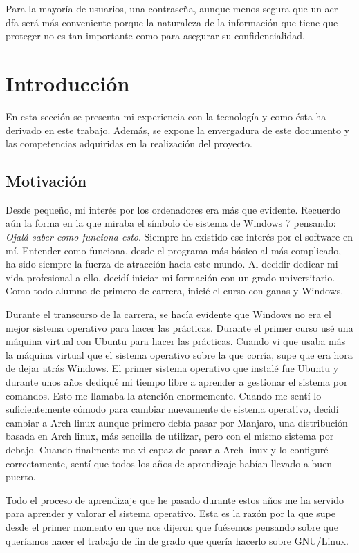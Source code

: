 \documentclass[titlepage, 12pt, a4paper]{article}
\begin{document}
Para la mayoría de usuarios, una contraseña, aunque menos segura que un \gls{acr-dfa} será más conveniente porque la naturaleza de la información que tiene que proteger no es tan importante como para asegurar su confidencialidad.
\clearpage
\section{Introducción}
En esta sección se presenta mi experiencia con la tecnología y como ésta ha derivado en este trabajo. Además, se expone la envergadura de este documento y las competencias adquiridas en la realización del proyecto.
\subsection{Motivación}
Desde pequeño, mi interés por los ordenadores era más que evidente. Recuerdo aún la forma en la que miraba el símbolo de sistema de Windows 7 pensando: \textit{Ojalá saber como funciona esto}. Siempre ha existido ese interés por el software en mí. Entender como funciona, desde el programa más básico al más complicado, ha sido siempre la fuerza de atracción hacia este mundo. Al decidir dedicar mi vida profesional a ello, decidí iniciar mi formación con un grado universitario.
Como todo alumno de primero de carrera, inicié el curso con ganas y Windows.\par
Durante el transcurso de la carrera, se hacía evidente que Windows no era el mejor sistema operativo para hacer las prácticas. Durante el primer curso usé una máquina virtual con \gls{Ubuntu} para hacer las prácticas. Cuando vi que usaba más la máquina virtual que el sistema operativo sobre la que corría, supe que era hora de dejar atrás Windows. El primer sistema operativo que instalé fue \gls{Ubuntu} y durante unos años dediqué mi tiempo libre a aprender a gestionar el sistema por comandos. Esto me llamaba la atención enormemente. Cuando me sentí lo suficientemente cómodo para cambiar nuevamente de sistema operativo, decidí cambiar a \gls{Arch linux} aunque primero debía pasar por \gls{Manjaro}, una distribución basada en \gls{Arch linux}, más sencilla de utilizar, pero con el mismo sistema por debajo. Cuando finalmente me vi capaz de pasar a \gls{Arch linux} y lo configuré correctamente, sentí que todos los años de aprendizaje habían llevado a buen puerto. \par
Todo el proceso de aprendizaje que he pasado durante estos años me ha servido para aprender y valorar el sistema operativo. Esta es la razón por la que supe desde el primer momento en que nos dijeron que fuésemos pensando sobre que queríamos hacer el trabajo de fin de grado que quería hacerlo sobre \gls{GNU/Linux}.\par
\end{document}
